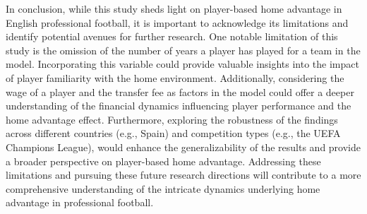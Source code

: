 \noindent
In conclusion, while this study sheds light on player-based home advantage in English professional football, it is important to acknowledge its limitations and identify potential avenues for further research. One notable limitation of this study is the omission of the number of years a player has played for a team in the model. Incorporating this variable could provide valuable insights into the impact of player familiarity with the home environment. Additionally, considering the wage of a player and the transfer fee as factors in the model could offer a deeper understanding of the financial dynamics influencing player performance and the home advantage effect. Furthermore, exploring the robustness of the findings across different countries (e.g., Spain) and competition types (e.g., the UEFA Champions League), would enhance the generalizability of the results and provide a broader perspective on player-based home advantage. Addressing these limitations and pursuing these future research directions will contribute to a more comprehensive understanding of the intricate dynamics underlying home advantage in professional football.